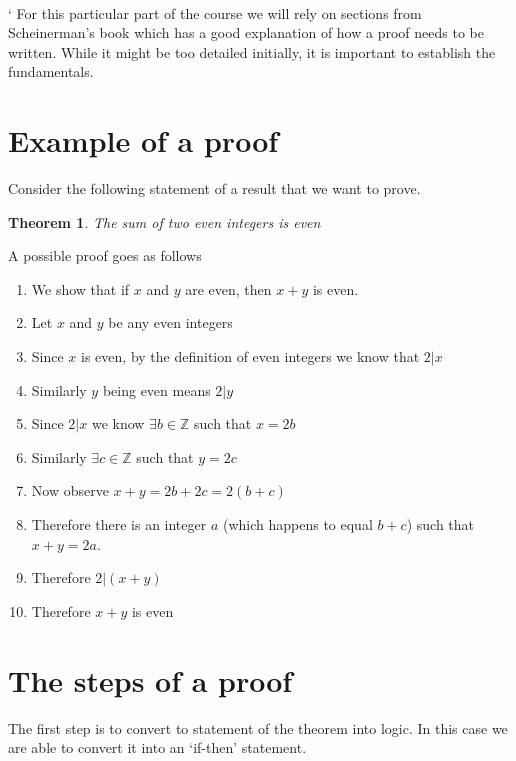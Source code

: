 \documentclass[12pt]{article}
\newtheorem{theorem}{Theorem}
\begin{document}
\begin{center}
\\
\vspace{1cm}
\end{center}

\vspace{0.5cm}\noindent
`
For this particular part of the course we will rely on sections from Scheinerman's book which has a good explanation of how a proof needs to be written. While it might be too detailed initially, it is important to establish the fundamentals.

\section*{Example of a proof}
Consider the following statement of a result that we want to prove.

\begin{theorem}
The sum of two even integers is even
\end{theorem}

A possible proof goes as follows

\begin{enumerate}
\item We show that if $x$ and $y$ are even, then $x + y$ is even.
\item Let $x$ and $y$ be any even integers
\item Since $x$ is even, by the definition of even integers we know that $2|x$
\item Similarly $y$ being even means $2|y$
\item Since $2|x$ we know $\exists b \in \mathbb{Z}$ such that $x=2b$
\item Similarly $\exists c \in \mathbb{Z}$ such that $y=2c$
\item Now observe $x + y = 2b + 2c = 2(b+c)$
\item Therefore there is an integer $a$ (which happens to equal $b + c$) such that $x + y = 2a$. 
\item Therefore $2|(x + y)$
\item Therefore $x + y$ is even
\end{enumerate}


\section*{The steps of a proof}
The first step is to convert to statement of the theorem into logic. In this case we are able to convert it into an `if-then' statement. 
\end{document}
